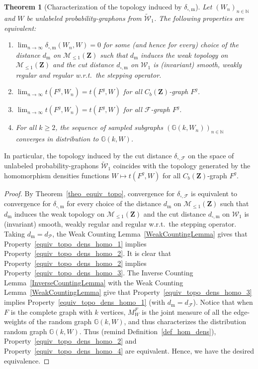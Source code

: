 \documentclass{amsart}
\newcommand{\wrt}{w.r.t.\ }
\theoremstyle{plain}
\newtheorem{theo}[Th]{Theorem}
\theoremstyle{definition}
\newcommand{\Space}{\mathbf{Z}}
\newcommand{\bbG}{\mathbb{G}}
\newcommand{\SubProba}{\mathcal{M}_{\leq1}(\Space)}
\newcommand{\CbFunct}{C_b(\Space)}
\newcommand{\Graphon}{\mathcal{W}_1}
\newcommand{\UGraphon}{\widetilde{\mathcal{W}}_1}
\newcommand{\m}{\mathrm{m}}
\newcommand{\dmeas}{d_\m}
\newcommand{\dcut}{d_{\square,\m}}
\newcommand{\ddcut}{\delta_{\square,\m}}
\newcommand{\dmeasF}{d_{\mathcal{F}}}
\newcommand{\ddcutF}{\delta_{\square,\mathcal{F}}}
\newcommand{\F}{\mathcal{F}}
\newcommand{\dmeasP}{d_{\mathcal{P}}}
\newcommand{\N}{\mathbb{N}}
\begin{document}
\begin{theo}[Characterization of the topology induced by $\ddcut$]
	\label{theo_equiv_topo_dens_homo}
Let $(W_n )_{n\in\N}$ and $W$ be unlabeled probability-graphons
	from $\UGraphon$.
The following properties are equivalent:
\begin{enumerate}[label=(\roman*)]
\item
$\lim_{n\to\infty}\ddcut(W_n,W) = 0$
for some (and hence for every) choice of the distance $\dmeas$ on $\SubProba$
such that $\dmeas$ induces the weak topology on $\SubProba$
and the cut distance $\dcut$ on $\Graphon$
is (invariant) smooth, weakly regular and 
regular \wrt the stepping operator.

\item
$\lim_{n\to\infty} t(F^g,W_n) = t(F^g,W)$
for all $\CbFunct$-graph $F^g$.

\item
$\lim_{n\to\infty} t(F^g,W_n) = t(F^g,W)$
for all $\F$-graph $F^g$.

\item
For all $k\geq 2$, the sequence of sampled subgraphs $(\bbG(k,W_n))_{n\in\N}$
	converges in distribution to $\bbG(k,W)$.
\end{enumerate}
\end{theo}

In particular, the topology induced by the cut distance $\ddcutF$
on the space of unlabeled probability-graphons 
$\UGraphon$
coincides with the topology generated by
the homomorphism densities functions
$W\mapsto t(F^g,W)$
for all $\CbFunct$-graph $F^g$.

\begin{proof}
  By   Theorem~\ref{theo_equiv_topo},  convergence   for  $\ddcutF$   is
  equivalent  to  convergence  for  $\ddcut$ for  every  choice  of  the
  distance $\dmeas$ on  $\SubProba$ such that $\dmeas$  induces the weak
  topology on $\SubProba$ and the  cut distance $\dcut$ on $\Graphon$ is
  (invariant)  smooth,  weakly regular  and  regular  \wrt the  stepping
  operator.     Taking     $\dmeas=\dmeasP$,    the     Weak    Counting
  Lemma~\ref{WeakCountingLemma}                gives                that
  Property~\ref{equiv_topo_dens_homo_1}                          implies
  Property~\ref{equiv_topo_dens_homo_2}.      It    is     clear    that
  Property~\ref{equiv_topo_dens_homo_2}                          implies
  Property~\ref{equiv_topo_dens_homo_3}.     The     Inverse    Counting
  Lemma~\ref{InverseCountingLemma}     with     the    Weak     Counting
  Lemma~\ref{WeakCountingLemma}                 give                that
  Property~\ref{equiv_topo_dens_homo_3}                          implies
  Property~\ref{equiv_topo_dens_homo_1} (with $\dmeas=\dmeasF$).  Notice
  that when $F$ is the complete  graph with $k$ vertices, $M_W^F$ is the
  joint measure of all the edge-weights of the random graph $\bbG(k,W)$,
  and  thus characterizes  the  distribution  random graph  $\bbG(k,W)$.
  Thus              (remind              Definition~\ref{def_hom_dens}),
  Property~\ref{equiv_topo_dens_homo_2}                              and
  Property~\ref{equiv_topo_dens_homo_4} are equivalent.   Hence, we have
  the desired equivalence.
\end{proof}
\end{document}
